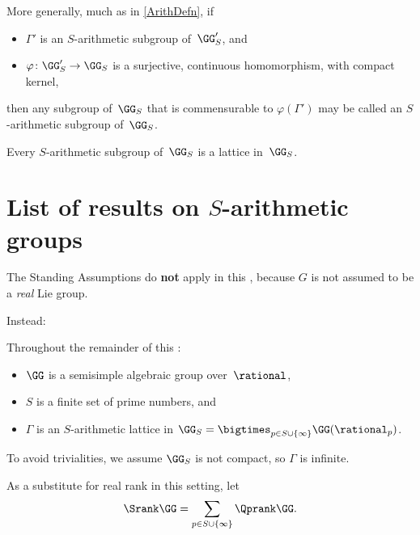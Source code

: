\begin{rem}
More generally, much as in \cref{ArithDefn}, if 
\noprelistbreak
	\begin{itemize}
	\item $\Gamma'$ is an $S$-arithmetic subgroup of~$\GG'_S$,
	and
	\item $\varphi \colon \GG'_S \to \GG_S$ is a surjective, continuous homomorphism, with compact kernel,
	\end{itemize}
then any subgroup of~$\GG_S$ that is commensurable to $\varphi(\Gamma')$ may be called an $S$-arithmetic subgroup of~$\GG_S$.
\end{rem}


\begin{thm}
Every $S$-arithmetic subgroup of\/~$\GG_S$ is a lattice in\/~$\GG_S$.
\end{thm}





\section{List of results on \texorpdfstring{$S$}{S}-arithmetic groups}

\begin{warn}
The Standing Assumptions  do \textbf{not} apply in this , because $G$ is not assumed to be a \emph{real} Lie group.
\end{warn}

Instead:

\begin{assump}
Throughout the remainder of this :
\noprelistbreak
	\begin{itemize}
	\item $\GG$ is a semisimple algebraic group over~$\rational$,
	\item $S$ is a finite set of prime numbers,
	and
	\item $\Gamma$ is an $S$-arithmetic lattice in $\GG_S = \bigtimes_{p \in S \cup \{\infty\}} \GG(\rational_p)$.
	\end{itemize}
To avoid trivialities, we assume $\GG_S$ is not compact, so $\Gamma$ is infinite.
\end{assump}

\begin{defn}
As a substitute for real rank in this setting, let%
		$$\Srank \GG = \sum_{p \in S \cup \{\infty\}} \Qprank \GG .$$
\end{defn}

